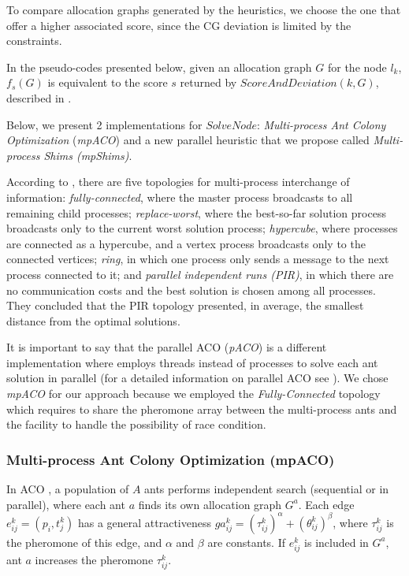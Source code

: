 \documentclass[preprint,authoryear]{elsarticle}
\begin{document}
To compare allocation graphs generated by the heuristics, we choose the one that offer a higher associated score, since the CG deviation is limited by the constraints.

In the pseudo-codes presented below, given an allocation graph $G$\/ for the node $l_k$, $f_s(G)$\/ is equivalent to the score $s$\/ returned by $ScoreAndDeviation(k,G) $, described in \cite{MesquitaSanches2023}.

Below, we present 2 implementations for $SolveNode$: {\it Multi-process Ant Colony Optimization}\/ ({\it mpACO})  and a new parallel heuristic that we propose called {\it Multi-process Shims (mpShims)}.

According to \cite[p.226]{manfrin2006}, there are five topologies for multi-process interchange of information: {\it fully-connected}, where the master process broadcasts to all remaining child processes; {\it replace-worst}, where the best-so-far solution process broadcasts only to the current worst solution process; {\it hypercube}, where processes are connected as a hypercube, and a vertex process broadcasts only to the connected vertices; {\it ring}, in which one process only sends a message to the next process connected to it; and {\it parallel independent runs (PIR)}, in which there are no communication costs and the best solution is chosen among all processes. They concluded that the PIR topology presented, in average, the smallest distance from the optimal solutions.

It is important to say that the parallel ACO ({\it pACO}) is a different implementation where employs threads instead of processes to solve each ant solution in parallel (for a detailed information on parallel ACO see \cite{Pedemonte2011}). We chose {\it mpACO} for our approach because we employed the {\it Fully-Connected} topology which requires to share the pheromone array between the multi-process ants and the facility to handle the possibility of race condition.


\subsubsection{Multi-process Ant Colony Optimization (mpACO)}

In ACO \cite{Dorigo1992}, a population of $A$\/ ants performs independent search (sequential or in parallel), where each ant $a$\/ finds its own allocation graph $G^a$. Each edge $e^k_{ij}=(p_i,t^k_j)$\/ has a general attractiveness $ga^k_{ij} = (\tau^k_{ij})^\alpha + (\theta^k_{ij})^\beta$, where $\tau^k_{ij}$\/ is the pheromone of this edge, and $\alpha$\/ and $\beta$\/ are constants. If $e^k_{ij}$\/ is included in $G^a$, ant $a$\/ increases the pheromone $\tau^k_{ij}$.
\end{document}
